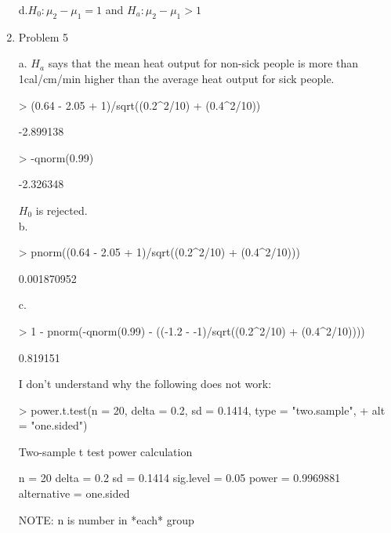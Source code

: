 \documentclass[11pt,letterpaper]{article}
\begin{document}
\begin{enumerate}
d.$H_0:\mu_2-\mu_1=1$ and $H_a:\mu_2-\mu_1>1$

\item Problem 5

a. $H_a$ says that the mean heat output for non-sick people is more than 1cal/cm/min higher than the average heat output for sick people.
\begin{Schunk}
\begin{Sinput}
> (0.64 - 2.05 + 1)/sqrt((0.2^2/10) + (0.4^2/10))
\end{Sinput}
\begin{Soutput}
[1] -2.899138
\end{Soutput}
\begin{Sinput}
> -qnorm(0.99)
\end{Sinput}
\begin{Soutput}
[1] -2.326348
\end{Soutput}
\end{Schunk}
$H_0$ is rejected.\\

b.
\begin{Schunk}
\begin{Sinput}
> pnorm((0.64 - 2.05 + 1)/sqrt((0.2^2/10) + (0.4^2/10)))
\end{Sinput}
\begin{Soutput}
[1] 0.001870952
\end{Soutput}
\end{Schunk}

c.
\begin{Schunk}
\begin{Sinput}
> 1 - pnorm(-qnorm(0.99) - ((-1.2 - -1)/sqrt((0.2^2/10) + (0.4^2/10))))
\end{Sinput}
\begin{Soutput}
[1] 0.819151
\end{Soutput}
\end{Schunk}
I don't understand why the following does not work:
\begin{Schunk}
\begin{Sinput}
> power.t.test(n = 20, delta = 0.2, sd = 0.1414, type = "two.sample", 
+     alt = "one.sided")
\end{Sinput}
\begin{Soutput}
     Two-sample t test power calculation 

              n = 20
          delta = 0.2
             sd = 0.1414
      sig.level = 0.05
          power = 0.9969881
    alternative = one.sided

 NOTE: n is number in *each* group 
\end{Soutput}
\end{Schunk}


\end{enumerate}
\end{document}

